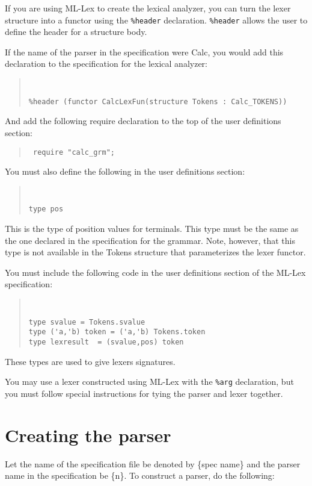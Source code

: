 \documentclass{article}
\begin{document}
If you are using ML-Lex to create the lexical analyzer, you
can turn the lexer structure into a functor using the
{\tt \%header} declaration.
{\tt \%header} allows the user to define the header for a structure body.

If the name of the parser in the specification were Calc, you
would add this declaration to the specification for the lexical 
analyzer:
\begin{quote}
\tt
\begin{verbatim}
%header (functor CalcLexFun(structure Tokens : Calc_TOKENS))
\end{verbatim}
\end{quote}
And add the following require declaration to the top of the
user definitions section:
\begin{quote}
\tt
\verb+require "calc_grm";+
\end{quote}


You must also define the following in the user definitions section:
\begin{quote}
\tt
\begin{verbatim}
type pos
\end{verbatim}
\end{quote}
This is the type of position values for terminals.  This type
must be the same as the one declared in the specification for
the grammar.  Note, however, that this type is not available
in the Tokens structure that parameterizes the lexer functor.

You must include the following code in the user definitions section of
the ML-Lex specification:
\begin{quote}
\tt
\begin{verbatim}
type svalue = Tokens.svalue
type ('a,'b) token = ('a,'b) Tokens.token
type lexresult  = (svalue,pos) token
\end{verbatim}
\end{quote}

These types are used to give lexers signatures.

You may use a lexer constructed using ML-Lex with the {\tt \%arg}
declaration, but you must follow special instructions for tying the parser
and lexer together.
 
\section{Creating the parser}
\label{create-parser}
Let the name of the specification file be denoted by \{spec name\} and
the parser name in the specification be \{n\}.
To construct a parser, do the following:
\end{document}

